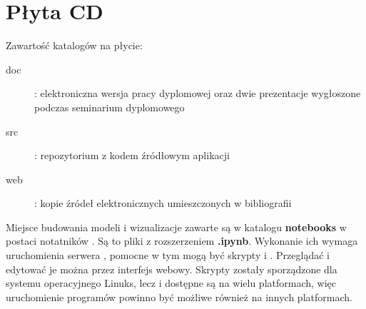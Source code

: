 \chapter{Płyta CD}\label{app:plyta}

\begin{figure}[htb]
\makebox[\textwidth]{\framebox[12.8cm]{\rule{0pt}{12.8cm}}}
\end{figure}
\pagebreak

Zawartość katalogów na płycie:
\begin{description}
    \item[doc] : elektroniczna wersja pracy dyplomowej oraz dwie prezentacje wygłoszone podczas seminarium dyplomowego
    \item[src] : repozytorium z kodem źródłowym aplikacji
    \item[web] : kopie źródeł elektronicznych umieszczonych w bibliografii
\end{description}

Miejsce budowania modeli i wizualizacje zawarte są w katalogu \textbf{notebooks} w postaci notatników . Są to pliki z rozszerzeniem \textbf{.ipynb}. Wykonanie ich wymaga uruchomienia serwera , pomocne w tym mogą być skrypty  i . Przeglądać i edytować je można przez interfejs webowy. Skrypty zostały sporządzone dla systemu operacyjnego Linuks, lecz  i  dostępne są na wielu platformach, więc uruchomienie programów powinno być możliwe również na innych platformach.

